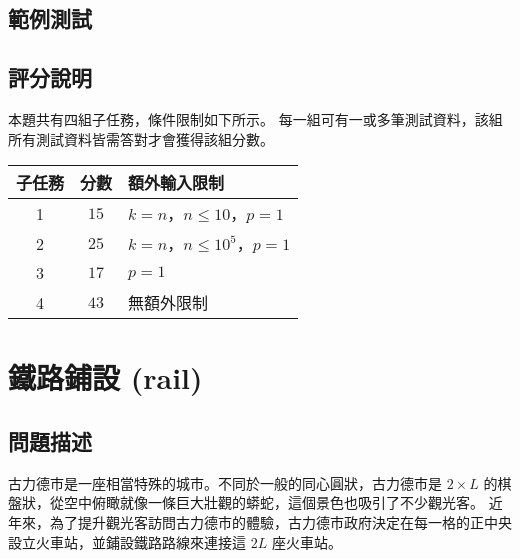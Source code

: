 \subsection{範例測試}

\begin{example}
%
%
\end{example}

\subsection{評分說明}

本題共有四組子任務，條件限制如下所示。
每一組可有一或多筆測試資料，該組所有測試資料皆需答對才會獲得該組分數。

\begin{longtable}[]{@{}ccl@{}}
\toprule
子任務 & 分數 & 額外輸入限制 \\
\midrule
\endhead
1 & \(15\) &
\begin{math}k=n\end{math}，\begin{math}n \le 10\end{math}，\begin{math}p=1\end{math} \\
2 & \(25\) &
\begin{math}k=n\end{math}，\begin{math}n \le 10^5\end{math}，\begin{math}p=1\end{math} \\
3 & \(17\) & \begin{math}p=1\end{math} \\
4 & \(43\) & 無額外限制 \\
\bottomrule
\end{longtable}

\section{鐵路鋪設 (rail)}

\subsection{問題描述}

古力德市是一座相當特殊的城市。不同於一般的同心圓狀，古力德市是
\begin{math}2\times L\end{math}
的棋盤狀，從空中俯瞰就像一條巨大壯觀的蟒蛇，這個景色也吸引了不少觀光客。
近年來，為了提升觀光客訪問古力德市的體驗，古力德市政府決定在每一格的正中央設立火車站，並鋪設鐵路路線來連接這
\begin{math}2L\end{math} 座火車站。

